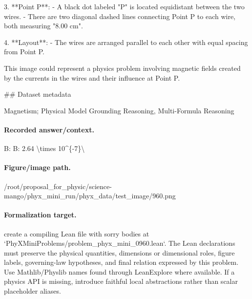 3. **Point P**:
   - A black dot labeled "P" is located equidistant between the two wires.
   - There are two diagonal dashed lines connecting Point P to each wire, both measuring "8.00 cm".

4. **Layout**:
   - The wires are arranged parallel to each other with equal spacing from Point P.

This image could represent a physics problem involving magnetic fields created by the currents in the wires and their influence at Point P.

\#\# Dataset metadata

Magnetism; Physical Model Grounding Reasoning, Multi-Formula Reasoning

\paragraph{Recorded answer/context.}
B: B: 2.64 \textbackslash{}times 10\textasciicircum{}\{-7\}\textbackslash{}

\paragraph{Figure/image path.}
/root/proposal\_for\_physic/science-mango/phyx\_mini\_run/phyx\_data/test\_image/960.png

\paragraph{Formalization target.}
create a compiling Lean file with sorry bodies at `PhyXMiniProblems/problem\_phyx\_mini\_0960.lean`. The Lean declarations must preserve the physical quantities, dimensions or dimensional roles, figure labels, governing-law hypotheses, and final relation expressed by this problem.
Use Mathlib/Physlib names found through LeanExplore where available. If a physics API is missing, introduce faithful local abstractions rather than scalar placeholder aliases.

